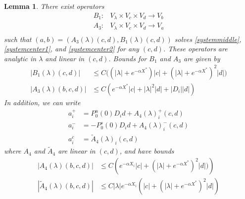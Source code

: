 \documentclass[10pt,reqno]{amsart}
\theoremstyle{plain}
\newtheorem{lemma}[theorem]{Lemma}
\theoremstyle{definition}
\theoremstyle{remark}
\numberwithin{theorem}{section}
\numberwithin{equation}{section}
\begin{document}
\begin{lemma}\label{Zinv2}
There exist operators
\begin{align*}
B_1: &V_\lambda \times V_c \times V_d \rightarrow V_b \\
A_3: &V_\lambda \times V_c \times V_d \rightarrow V_a \\
\end{align*}
such that $( a, b ) = ( A_3(\lambda)(c, d), B_1(\lambda)(c, d) )$ solves \eqref{systemmiddle}, \eqref{systemcenter1}, and \eqref{systemcenter2} for any $(c, d)$. These operators are analytic in $\lambda$ and linear in $(c, d)$. Bounds for $B_1$ and $A_3$ are given by
\begin{align}
|B_1(\lambda)(c, d)| &\leq C\Big( (|\lambda|+e^{-\alpha X^*})|c| + (|\lambda| + e^{-\alpha X^*})^2 |d| \Big) \label{B1bound} \\
|A_3(\lambda)(b, c, d)| &\leq C \left( e^{-\alpha X^*} |c| + |\lambda|^2 |d| + |D_i||d| \right) \label{A3bound} 
\end{align} 
In addition, we can write
\begin{align*}
a_i^+ &= P_0^u(0) D_i d + A_4(\lambda)_i^+(c, d) \\
a_i^- &= -P_0^s(0) D_i d + A_4(\lambda)_i^-(c, d) \\
a_i^c &= \tilde{A}_4(\lambda)_i(c, d) 
\end{align*}
where $A_4$ and $\tilde{A}_4$ are linear in $(c, d)$, and have bounds
\begin{align}
|A_4(\lambda)(b, c, d)|
&\leq C \left( e^{-\alpha X_i}|c| + (|\lambda| + e^{-\alpha X^*})^2 |d| ) \right)  \label{A4bound} \\
|\tilde{A}_4(\lambda)(b, c, d)| &\leq C |\lambda| e^{-\alpha X_i} \left( |c| + (|\lambda| + e^{-\alpha X^*})^2  |d| \right) \label{tildeA4bound}
\end{align}


\end{lemma}
\end{document}
